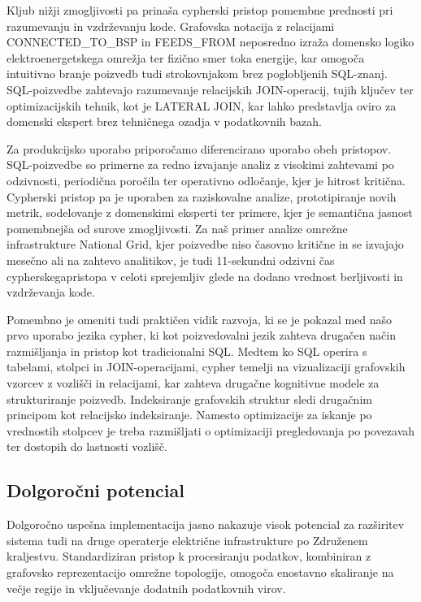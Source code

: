 \documentclass[a4paper,12pt,openright]{book}
\begin{document}
Kljub nižji zmogljivosti pa prinaša cypherski pristop pomembne prednosti pri razumevanju in vzdrževanju kode. Grafovska notacija z relacijami CONNECTED\_TO\_BSP in FEEDS\_FROM neposredno izraža domensko logiko elektroenergetskega omrežja ter fizično smer toka energije, kar omogoča intuitivno branje poizvedb tudi strokovnjakom brez poglobljenih SQL-znanj. SQL-poizvedbe zahtevajo razumevanje relacijskih JOIN-operacij, tujih ključev ter optimizacijskih tehnik, kot je LATERAL JOIN, kar lahko predstavlja oviro za domenski ekspert brez tehničnega ozadja v podatkovnih bazah.

Za produkcijsko uporabo priporočamo diferencirano uporabo obeh pristopov. SQL-poizvedbe so primerne za redno izvajanje analiz z visokimi zahtevami po odzivnosti, periodična poročila ter operativno odločanje, kjer je hitrost kritična. Cypherski pristop pa je uporaben za raziskovalne analize, prototipiranje novih metrik, sodelovanje z domenskimi eksperti ter primere, kjer je semantična jasnost pomembnejša od surove zmogljivosti. Za naš primer analize omrežne infrastrukture National Grid, kjer poizvedbe niso časovno kritične in se izvajajo mesečno ali na zahtevo analitikov, je tudi 11-sekundni odzivni čas cypherskegapristopa v celoti sprejemljiv glede na dodano vrednost berljivosti in vzdrževanja kode.

Pomembno je omeniti tudi praktičen vidik razvoja, ki se je pokazal med našo prvo uporabo jezika cypher, ki kot poizvedovalni jezik zahteva drugačen način razmišljanja in pristop kot tradicionalni SQL. Medtem ko SQL operira s tabelami, stolpci in JOIN-operacijami, cypher temelji na vizualizaciji grafovskih vzorcev z vozlišči in relacijami, kar zahteva drugačne kognitivne modele za strukturiranje poizvedb. Indeksiranje grafovskih struktur sledi drugačnim principom kot relacijsko indeksiranje. Namesto optimizacije za iskanje po vrednostih stolpcev je treba razmišljati o optimizaciji pregledovanja po povezavah ter dostopih do lastnosti vozlišč. 

\subsection{Dolgoročni potencial}

Dolgoročno uspešna implementacija jasno nakazuje visok potencial za razširitev sistema tudi na druge operaterje električne infrastrukture po Združenem kraljestvu. Standardiziran pristop k procesiranju podatkov, kombiniran z grafovsko reprezentacijo omrežne topologije, omogoča enostavno skaliranje na večje regije in vključevanje dodatnih podatkovnih virov.
\end{document}
